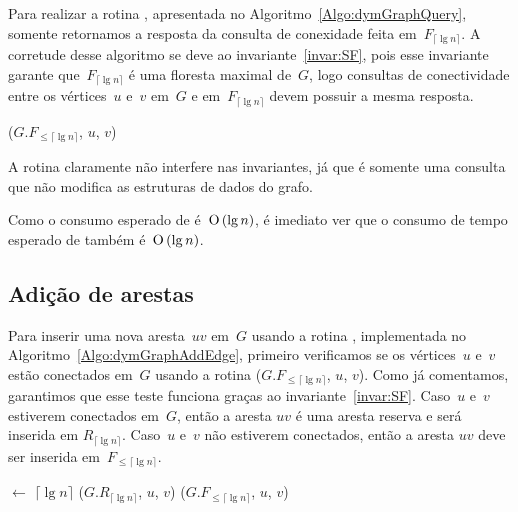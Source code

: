 Para realizar a rotina \dymGraphQuery{}, apresentada no Algoritmo~\ref{Algo:dymGraphQuery}, somente retornamos a resposta da consulta de conexidade feita em~$F_{\lceil \lg n \rceil}$. A corretude desse algoritmo se deve ao invariante~\ref{invar:SF}, pois esse invariante garante que~$F_{\lceil \lg n \rceil}$ é uma floresta maximal de~$G$, logo consultas de conectividade entre os vértices~$u$ e~$v$ em~$G$ e em~$F_{\lceil \lg n \rceil}$ devem possuir a mesma resposta.

\begin{algorithm}
\caption{\dymGraphQuery($G$, $u$, $v$)}
\label{Algo:dymGraphQuery}
\begin{algorithmic}[1]
\State \Return \dymForestQuery($G$.$F_{\leqslant\lceil \lg n \rceil}$, $u$, $v$)
\end{algorithmic}
\end{algorithm}

A rotina \dymGraphQuery{} claramente não interfere nas invariantes, já que  é somente uma consulta que não modifica as estruturas de dados do grafo.

Como o consumo esperado de \dymForestQuery{} é~$\text{O}\left(\lg n\right)$, é imediato ver que o consumo de tempo esperado de \dymGraphQuery{} também é~$\text{O}\left(\lg n\right)$.

\subsection{Adição de arestas}

Para inserir uma nova aresta~$uv$ em~$G$ usando a rotina \dymGraphAddEdge{}, implementada no Algoritmo~\ref{Algo:dymGraphAddEdge}, primeiro verificamos se os vértices~$u$ e~$v$ estão conectados em~$G$ usando a rotina \dymForestQuery($G.F_{\leqslant \lceil \lg n \rceil}$, $u$, $v$). Como já comentamos, garantimos que esse teste funciona graças ao invariante~\ref{invar:SF}. Caso~$u$ e~$v$ estiverem conectados em~$G$, então a aresta $uv$ é uma aresta reserva e será inserida em $R_{\lceil \lg n \rceil}$. Caso~$u$ e~$v$ não estiverem conectados, então a aresta $uv$ deve ser inserida em~$F_{\leqslant \lceil \lg n \rceil}$.

\begin{algorithm}
\caption{\dymGraphAddEdge($G$, $u$, $v$)}
\label{Algo:dymGraphAddEdge}
\begin{algorithmic}[1]
\State \nivel[$u$,$v$] $\gets$ $\lceil \lg n \rceil$
\State \graphAdd($G$.$R_{\lceil \lg n \rceil}$, $u$, $v$)
\Else 
\State \dymForestAddEdge($G.F_{\leqslant\lceil \lg n \rceil}$, $u$, $v$)
\EndIf
\end{algorithmic}
\end{algorithm}

